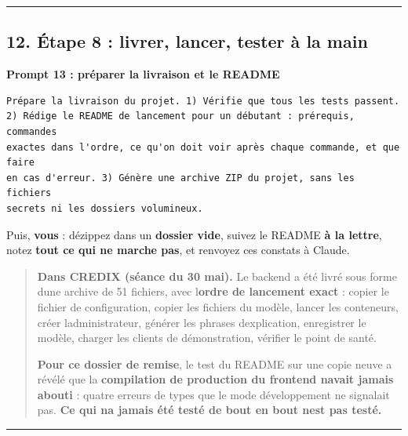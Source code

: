 \documentclass[
  french,
  11pt,
  a4paper,
]{article}
\begin{document}
\begin{center}\rule{0.5\linewidth}{0.5pt}\end{center}

\subsection{12. Étape 8 : livrer, lancer, tester à la
main}\label{12-uxe9tape-8--livrer-lancer-tester-uxe0-la-main}

\textbf{Prompt 13 : préparer la livraison et le README}

\begin{Verbatim}[breaklines=true,breakanywhere=true,fontsize=\small,frame=leftline,framerule=1.6pt,rulecolor=\color{credixblue},framesep=3mm,xleftmargin=2mm,xrightmargin=1mm]
Prépare la livraison du projet. 1) Vérifie que tous les tests passent.
2) Rédige le README de lancement pour un débutant : prérequis, commandes
exactes dans l'ordre, ce qu'on doit voir après chaque commande, et que faire
en cas d'erreur. 3) Génère une archive ZIP du projet, sans les fichiers
secrets ni les dossiers volumineux.
\end{Verbatim}

Puis, \textbf{vous} : dézippez dans un \textbf{dossier vide}, suivez le
README \textbf{à la lettre}, notez \textbf{tout ce qui ne marche pas},
et renvoyez ces constats à Claude.

\begin{quote}
\textbf{Dans CREDIX (séance du 30 mai).} Le backend a été livré sous
forme d\textquotesingle une archive de 51 fichiers, avec
l\textquotesingle{}\textbf{ordre de lancement exact} : copier le fichier
de configuration, copier les fichiers du modèle, lancer les conteneurs,
créer l\textquotesingle administrateur, générer les phrases
d\textquotesingle explication, enregistrer le modèle, charger les
clients de démonstration, vérifier le point de santé.

\textbf{Pour ce dossier de remise}, le test du README sur une copie
neuve a révélé que la \textbf{compilation de production du frontend
n\textquotesingle avait jamais abouti} : quatre erreurs de types que le
mode développement ne signalait pas. \textbf{Ce qui n\textquotesingle a
jamais été testé de bout en bout n\textquotesingle est pas testé.}
\end{quote}

\begin{center}\rule{0.5\linewidth}{0.5pt}\end{center}
\end{document}
